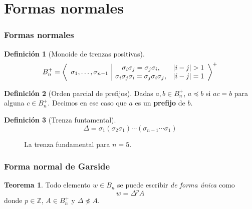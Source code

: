 \documentclass{beamer}
\theoremstyle{definition}
\newtheorem{teorema}{Teorema}
\newtheorem{defi}{Definición}
\newcommand{\Z}{\mathbb{Z}}
\begin{document}
\section{Formas normales}
\begin{frame}
\frametitle{Formas normales}
\begin{defi}[Monoide de trenzas positivas]
\[
B_n^+=\left\langle\begin{array}{c| c c}
\multirow{2}{*}{$\sigma_1,\dots,\sigma_{n-1}$} & \sigma_i\sigma_j=\sigma_j\sigma_i, & |i-j|>1\\
& \sigma_i\sigma_j\sigma_i=\sigma_j\sigma_i\sigma_j, & |i-j|=1
\end{array}\right\rangle^+
\]
\end{defi}
\begin{defi}[Orden parcial de prefijos]
Dadas $a,b\in B_n^+$, $a\preccurlyeq b$ si $ac=b$ para alguna $c\in B_n^+$. Decimos en ese caso que $a$ es un \textbf{prefijo} de $b$. %
\end{defi}
\end{frame}

\begin{frame}

\begin{defi}[Trenza funtamental]
$$\Delta=\sigma_1(\sigma_2\sigma_1)\cdots(\sigma_{n-1}\cdots\sigma_1)$$
\end{defi} 
\begin{figure}[h!]
\centering
{}
\caption{La trenza fundamental para $n=5$.}
\end{figure}
\end{frame}

\begin{frame}
\frametitle{Forma normal de Garside}

\begin{teorema}
Todo elemento $w\in B_n$ se puede escribir \emph{de forma única} como $$w=\Delta^pA$$ donde $p\in\Z$, $A\in B_n^+$ y $\Delta\not\preccurlyeq A$. 
\end{teorema}

\end{frame}
\end{document}
